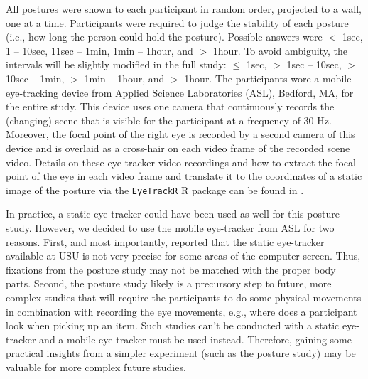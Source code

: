 \documentclass[11pt]{asaproc}
\begin{document}
All postures were shown to each participant in random order, projected to a wall, one at a time.
Participants were required to judge the stability of each posture (i.e., how long the person could hold the posture).
Possible answers were
$<$ 1sec, 1 -- 10sec, 11sec -- 1min, 1min -- 1hour, and $>$ 1hour.
To avoid ambiguity, the intervals will be slightly modified in the full study:
$\leq$ 1sec,  $>$ 1sec -- 10sec, $>$ 10sec -- 1min, $>$ 1min -- 1hour, and $>$ 1hour.
The participants wore a mobile eye-tracking device from Applied Science Laboratories (ASL), Bedford, MA, for the entire study.
This device uses one camera that continuously records the (changing) scene that is visible for the participant at a frequency of 30 Hz. 
Moreover, the focal point of the right eye is recorded by a second camera of this device and is overlaid as a cross-hair
on each video frame of the recorded scene video. Details on these eye-tracker video recordings and how to extract
the focal point of the eye in each video frame and translate it to the coordinates of a static image of the posture via the
{\tt EyeTrackR} R package can be found in \cite{LS2016ASA,LS2017ASA}.

In practice, a static eye-tracker could have been used as well for this posture study. However, we decided to use the mobile
eye-tracker from ASL for two reasons. First, and most importantly, \cite{Faw2016} reported that the static eye-tracker available
at USU is not very precise for some areas of the computer screen. Thus, fixations from the posture study may not be matched with
the proper body parts. Second, the posture study likely is a precursory step to future, more complex studies
that will require the participants to do some physical movements in combination with recording
the eye movements, e.g., where does a participant look when picking up an item.
Such studies can't be conducted with a static eye-tracker and a mobile eye-tracker must be used instead.  
Therefore, gaining some practical insights from a simpler experiment (such as the posture study) may be valuable
for more complex future studies.
\end{document}

